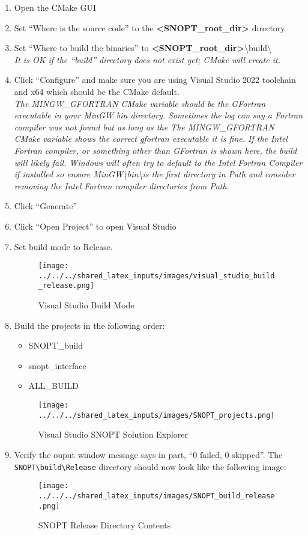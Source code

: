 \begin{enumerate}
    \item Open the CMake GUI
	\item Set “Where is the source code” to the \textbf{\textless SNOPT\_root\_dir\textgreater} directory
	\item Set “Where to build the binaries” to \textbf{\textless SNOPT\_root\_dir\textgreater}\textbackslash build\textbackslash \\ \emph{It is OK if the ``build'' directory does not exist yet; CMake will create it.}
    \item Click ``Configure'' and make sure you are using Visual Studio 2022 toolchain and x64 which should be the CMake default. \\
	\emph{The MINGW\_GFORTRAN CMake variable should be the GFortran executable in your MinGW bin directory. Sometimes the log can say a Fortran compiler was not found but as long as the The MINGW\_GFORTRAN CMake variable shows the correct gfortran executable it is fine. If the Intel Fortran compiler, or something other than GFortran is shown here, the build will likely fail. Windows will often try to default to the Intel Fortran Compiler if installed so ensure MinGW\textbackslash bin\textbackslash  is the first directory in Path and consider removing the Intel Fortran compiler directories from Path.}

    \item Click ``Generate''
    \item Click ``Open Project'' to open Visual Studio
    \item Set build mode to Release.
    
    \begin{figure}[H]
        \centering
        \texttt{[image: ../../../shared\_latex\_inputs/images/visual\_studio\_build\_release.png]}
        \caption{Visual Studio Build Mode}
    \end{figure}
    
    \item Build the projects in the following order: 
		\begin{itemize}	
			\item SNOPT\_build
 			\item snopt\_interface
			\item ALL\_BUILD
		\end{itemize}
    
    \begin{figure}[H]
        \centering
        \texttt{[image: ../../../shared\_latex\_inputs/images/SNOPT\_projects.png]}
        \caption{Visual Studio SNOPT Solution Explorer}
    \end{figure}
    
    \item Verify the ouput window message says in part, ``0 failed, 0 skipped''. 
	The \verb|SNOPT\build\Release| directory should now look like the following image:
    
    \begin{figure}[H]
        \centering
        \texttt{[image: ../../../shared\_latex\_inputs/images/SNOPT\_build\_release.png]}
        \caption{SNOPT Release Directory Contents}
    \end{figure}

\end{enumerate}
